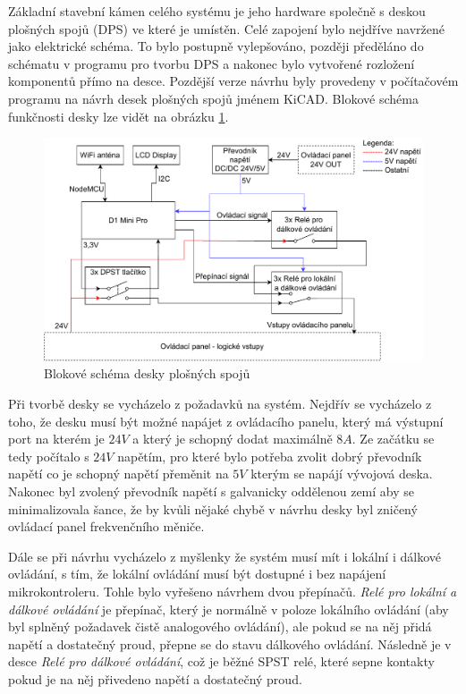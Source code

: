 Základní stavební kámen celého systému je jeho hardware společně s deskou plošných spojů (DPS) ve které je umístěn. Celé zapojení bylo nejdříve navržené jako elektrické schéma. To bylo postupně vylepšováno, později předěláno do schématu v programu pro tvorbu DPS a nakonec bylo vytvořené rozložení komponentů přímo na desce. Pozdější verze návrhu byly provedeny v počítačovém programu na návrh desek plošných spojů jménem KiCAD. Blokové schéma funkčnosti desky lze vidět na obrázku \ref{fig:SchemaDesky}.

\begin{figure}[hptb]
	\centering
	\includegraphics[width=1\linewidth]{images/Electrical_Schematic_V2.drawio.pdf}
	\caption{Blokové schéma desky plošných spojů}
	\label{fig:SchemaDesky}
\end{figure}

Při tvorbě desky se vycházelo z požadavků na systém. Nejdřív se vycházelo z toho, že desku musí být možné napájet z ovládacího panelu, který má výstupní port na kterém je $24V$ a který je schopný dodat maximálně $8A$. Ze začátku se tedy počítalo s $24V$ napětím, pro které bylo potřeba zvolit dobrý převodník napětí co je schopný napětí přeměnit na $5V$ kterým se napájí vývojová deska. Nakonec byl zvolený převodník napětí s galvanicky oddělenou zemí aby se minimalizovala šance, že by kvůli nějaké chybě v návrhu desky byl zničený ovládací panel frekvenčního měniče.
\cite{SiemensG120DGettingStarted}

Dále se při návrhu vycházelo z myšlenky že systém musí mít i lokální i dálkové ovládání, s tím, že lokální ovládání musí být dostupné i bez napájení mikrokontroleru. Tohle bylo vyřešeno návrhem dvou přepínačů. \textit{Relé pro lokální a dálkové ovládání} je přepínač, který je normálně v poloze lokálního ovládání (aby byl splněný požadavek čistě analogového ovládání), ale pokud se na něj přidá napětí a dostatečný proud, přepne se do stavu dálkového ovládání. Následně je v desce \textit{Relé pro dálkové ovládání}, což je běžné SPST relé, které sepne kontakty pokud je na něj přivedeno napětí a dostatečný proud.

